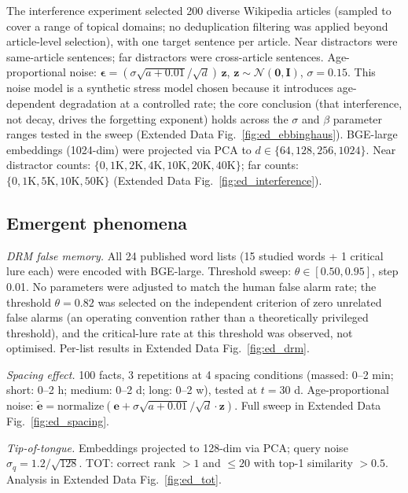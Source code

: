 \documentclass[11pt]{article}
\begin{document}
The interference experiment selected 200 diverse Wikipedia articles (sampled to cover a range of topical domains; no deduplication filtering was applied beyond article-level selection), with one target sentence per article. Near distractors were same-article sentences; far distractors were cross-article sentences. Age-proportional noise: $\boldsymbol{\epsilon} = (\sigma \sqrt{a + 0.01}/\sqrt{d})\,\mathbf{z}$, $\mathbf{z} \sim \mathcal{N}(\mathbf{0}, \mathbf{I})$, $\sigma = 0.15$. This noise model is a synthetic stress model chosen because it introduces age-dependent degradation at a controlled rate; the core conclusion (that interference, not decay, drives the forgetting exponent) holds across the $\sigma$ and $\beta$ parameter ranges tested in the sweep (Extended Data Fig.~\ref{fig:ed_ebbinghaus}). BGE-large embeddings (1024-dim) were projected via PCA to $d \in \{64, 128, 256, 1024\}$. Near distractor counts: $\{0, 1\text{K}, 2\text{K}, 4\text{K}, 10\text{K}, 20\text{K}, 40\text{K}\}$; far counts: $\{0, 1\text{K}, 5\text{K}, 10\text{K}, 50\text{K}\}$ (Extended Data Fig.~\ref{fig:ed_interference}).

\subsection*{Emergent phenomena}

\textit{DRM false memory.} All 24 published word lists\cite{roediger1995} (15 studied words + 1 critical lure each) were encoded with BGE-large. Threshold sweep: $\theta \in [0.50, 0.95]$, step 0.01. No parameters were adjusted to match the human false alarm rate; the threshold $\theta = 0.82$ was selected on the independent criterion of zero unrelated false alarms (an operating convention rather than a theoretically privileged threshold), and the critical-lure rate at this threshold was observed, not optimised. Per-list results in Extended Data Fig.~\ref{fig:ed_drm}.

\textit{Spacing effect.} 100 facts, 3 repetitions at 4 spacing conditions (massed: 0--2 min; short: 0--2 h; medium: 0--2 d; long: 0--2 w), tested at $t = 30$ d. Age-proportional noise: $\tilde{\mathbf{e}} = \text{normalize}(\mathbf{e} + \sigma\sqrt{a+0.01}/\sqrt{d}\cdot\mathbf{z})$. Full sweep in Extended Data Fig.~\ref{fig:ed_spacing}.

\textit{Tip-of-tongue.} Embeddings projected to 128-dim via PCA; query noise $\sigma_q = 1.2/\sqrt{128}$. TOT: correct rank $>1$ and $\leq 20$ with top-1 similarity $> 0.5$. Analysis in Extended Data Fig.~\ref{fig:ed_tot}.
\end{document}
